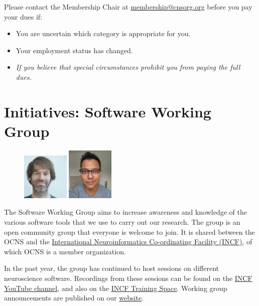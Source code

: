 \documentclass[11pt,a4paper,oneside]{article}
\begin{document}
Please contact the Membership Chair at \href{mailto:membership@cnsorg.org}{membership@cnsorg.org} before you pay your dues if:
\begin{itemize}
  \item You are uncertain which category is appropriate for you.
  \item Your employment status has changed.
\item \emph{If you believe that special circumstances prohibit you from paying the full dues.}
\end{itemize}


\clearpage
\section*{Initiatives: Software Working Group}%
\begin{figure}
  \includegraphics[width=0.2\textwidth]{images/marcel}
  \includegraphics[width=0.2\textwidth]{images/ankur-sinha}
\end{figure}

The Software Working Group aims to increase awareness and knowledge of the various software tools that we use to carry out our research.
The group is an open community group that everyone is welcome to join.
It is shared between the OCNS and the \href{https://incf.org}{International Neuroinformatics Co-ordinating Facility (INCF)}, of which OCNS is a member organization.

In the past year, the group has continued to host sessions on different neuroscience software.
Recordings from these sessions can be found on the \href{https://www.youtube.com/@IncfOrg_INCF/videos}{INCF YouTube channel}, and also on the \href{https://training.incf.org/course/incfocns-working-group-computational-neuroscience-software}{INCF Training Space}.
Working group announcements are published on our \href{https://ocns.github.io/SoftwareWG/}{website}.
\end{document}
